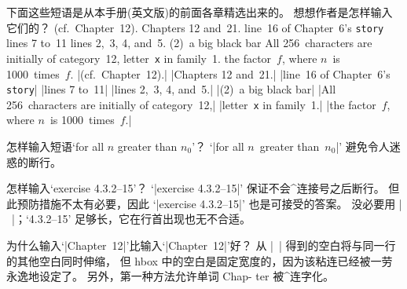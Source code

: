 \exercise 下面这些短语是从本手册(英文版)的前面各章精选出来的。%
想想作者是怎样输入它们的？
\begindisplay
(cf.~Chapter~12).\cr
Chapters 12 and~21.\cr
line~16 of Chapter~6's {\tt story}\cr
lines 7 to~11\cr
lines 2,~3, 4, and~5.\cr
(2)~a big black bar\cr
All 256~characters are initially of category~12,\cr
letter~{\tt x} in family~1.\cr
the factor~$f$, where $n$~is 1000~times~$f$.\cr
\enddisplay
\answer|(cf.~Chapter~12).|\parbreak
|Chapters 12 and~21.|\parbreak
|line~16 of Chapter~6's {\tt story}|\parbreak
|lines 7 to~11|\parbreak
|lines 2,~3, 4, and~5.|\parbreak
|(2)~a big black bar|\parbreak
|All 256~characters are initially of category~12,|\parbreak
|letter~{\tt x} in family~1.|\parbreak
|the factor~$f$, where $n$~is 1000~times~$f$.|

\exercise 怎样输入短语`for all $n$ greater than
$n_0$'\thinspace ？
\answer `|for all $n$~greater than~$n_0$|' 避免令人迷惑的断行。

\exercise 怎样输入`exercise 4.3.2--15'\thinspace ？
\answer \1`|exercise \hbox{4.3.2--15}|' 保证不会^{连接号}之后断行。
但此预防措施不太有必要，因此 `|exercise 4.3.2--15|' 也是可接受的答案。
没必要用 |~|；`\hbox{4.3.2--15}' 足够长，它在行首出现也无不合适。

\exercise 为什么输入`|Chapter~12|'比输入`|\hbox{Chapter 12}|'好？
\answer 从 |~| 得到的空白将与同一行的其他空白同时伸缩，
但 hbox 中的空白是固定宽度的，因为该粘连已经被一劳永逸地设定了。
另外，第一种方法允许单词 Chap-\break
ter 被^{连字化}。

